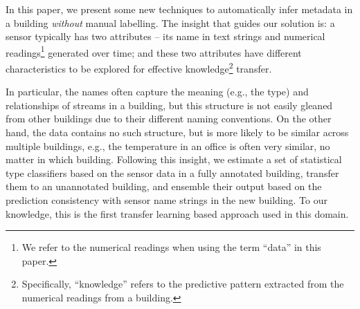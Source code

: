 In this paper, we present some new techniques to automatically infer metadata in a building {\it without} manual labelling.
The insight that guides our solution is: a sensor typically has two attributes -- its name in text strings and numerical readings\footnote{We refer to the numerical readings when using the term ``data'' in this paper.} generated over time; and these two attributes have different characteristics to be explored for effective knowledge\footnote{Specifically, ``knowledge'' refers to the predictive pattern extracted from the numerical readings from a building.} transfer.

In particular, the names often capture the meaning (e.g., the type) and relationships of streams in a building, but this structure is not easily gleaned from other buildings due to their different naming conventions.
On the other hand, the data contains no such structure, but is more likely to be similar across multiple buildings, e.g., the temperature in an office is often very similar, no matter in which building.
Following this insight, we estimate a set of statistical type classifiers based on the sensor data in a fully annotated building, transfer them to an unannotated building, and ensemble their output based on the prediction consistency with sensor name strings in the new building.
To our knowledge, this is the first transfer learning based approach used in this domain.

